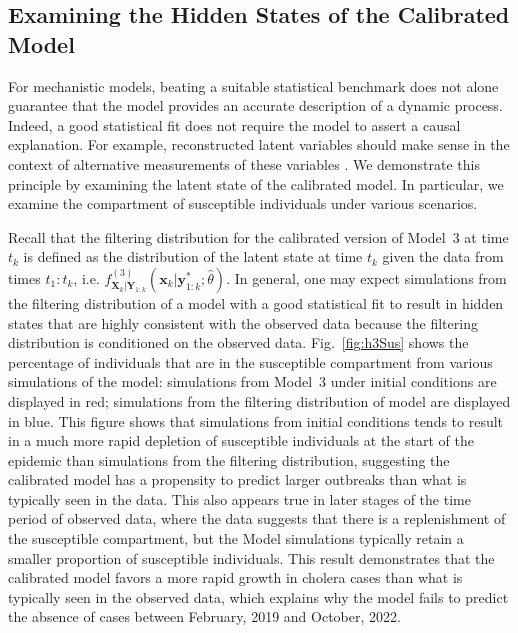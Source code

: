 \subsection{Examining the Hidden States of the Calibrated Model}

For mechanistic models, beating a suitable statistical benchmark does not alone guarantee that the model provides an accurate description of a dynamic process.
Indeed, a good statistical fit does not require the model to assert a causal explanation.
For example, reconstructed latent variables should make sense in the context of alternative measurements of these variables \citep{grad12}.
We demonstrate this principle by examining the latent state of the calibrated model.
In particular, we examine the compartment of susceptible individuals under various scenarios.

Recall that the filtering distribution for the calibrated version of Model~3 at time $t_k$ is defined as the distribution of the latent state at time $t_k$ given the data from times $t_{1}:t_{k}$, i.e. $f^{(3)}_{\bm{X}_k|\bm{Y}_{1:k}}(\bm{x}_{k} | \bm{y}^*_{1:k} ; \hat\theta)$.
In general, one may expect simulations from the filtering distribution of a model with a good statistical fit to result in hidden states that are highly consistent with the observed data because the filtering distribution is conditioned on the observed data.
Fig.~\ref{fig:h3Sus} shows the percentage of individuals that are in the susceptible compartment from various simulations of the model:
simulations from Model~3 under initial conditions are displayed in red; simulations from the filtering distribution of model are displayed in blue.
This figure shows that simulations from initial conditions tends to result in a much more rapid depletion of susceptible individuals at the start of the epidemic than simulations from the filtering distribution, suggesting the calibrated model has a propensity to predict larger outbreaks than what is typically seen in the data.
This also appears true in later stages of the time period of observed data, where the data suggests that there is a replenishment of the susceptible compartment, but the Model simulations typically retain a smaller proportion of susceptible individuals.
This result demonstrates that the calibrated model favors a more rapid growth in cholera cases than what is typically seen in the observed data, which explains why the model fails to predict the absence of cases between February, 2019 and October, 2022.




